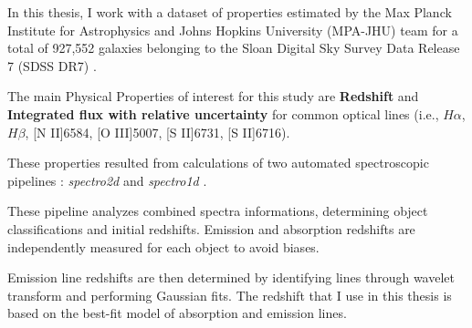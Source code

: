 In this thesis, I work with a dataset of properties estimated by the Max Planck Institute for Astrophysics and Johns Hopkins University (MPA-JHU) team for a total of 927,552 galaxies belonging to the Sloan Digital Sky Survey Data Release 7 (SDSS DR7) \cite{2009ApJS..182..543A, mpa-sdss-dr7}.

The main Physical Properties of interest for this study are \textbf{Redshift} and \textbf{Integrated flux with relative uncertainty} for common optical lines (i.e., $H\alpha$, $H\beta$, [N II]6584, [O III]5007, [S II]6731, [S II]6716).

These properties resulted from calculations of two automated spectroscopic pipelines : \textit{spectro2d} and \textit{spectro1d} \cite{2002AJ....123..485S}.

 These pipeline analyzes combined spectra informations, determining object classifications and initial redshifts. Emission and absorption redshifts are independently measured for each object to avoid biases.

Emission line redshifts are then determined by identifying lines through wavelet transform and performing Gaussian fits.
The redshift that I use in this thesis is based on the best-fit model of absorption and emission lines. 

